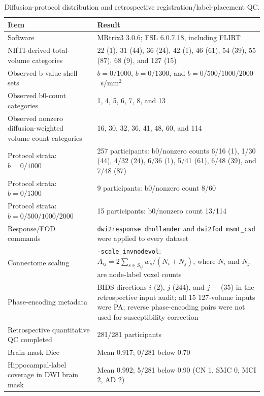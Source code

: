 \documentclass{article}
\providecommand{\DIFaddtex}[1]{{\protect\color{blue}#1}} %
\providecommand{\DIFaddFL}[1]{\DIFadd{#1}} %
\providecommand{\DIFadd}[1]{\texorpdfstring{\DIFaddtex{#1}}{#1}} %
\begin{document}
\begin{table}[!htbp]
\color{blue}
\centering
\caption{\DIFaddFL{Diffusion-protocol distribution and retrospective registration/label-placement QC.}}
\label{tab:protocol_qc_summary}
\footnotesize
\begin{tabularx}{\textwidth}{@{}p{}X@{}}
\toprule
\DIFaddFL{Item }& \DIFaddFL{Result}\\
\midrule
\DIFaddFL{Software }& \DIFaddFL{MRtrix3 3.0.6; FSL 6.0.7.18, including FLIRT}\\
\DIFaddFL{NIfTI-derived total-volume categories }& \DIFaddFL{22 (1), 31 (44), 36 (24), 42 (1), 46 (61), 54 (39), 55 (87), 68 (9), and 127 (15)}\\
\DIFaddFL{Observed b-value shell sets }& \DIFaddFL{$b=0/1000$, $b=0/1300$, and $b=0/500/1000/2000$~s/mm$^2$}\\
\DIFaddFL{Observed b0-count categories }& \DIFaddFL{1, 4, 5, 6, 7, 8, and 13}\\
\DIFaddFL{Observed nonzero diffusion-weighted volume-count categories }& \DIFaddFL{16, 30, 32, 36, 41, 48, 60, and 114}\\
\DIFaddFL{Protocol strata: $b=0/1000$ }& \DIFaddFL{257 participants: b0/nonzero counts 6/16 (1), 1/30 (44), 4/32 (24), 6/36 (1), 5/41 (61), 6/48 (39), and 7/48 (87)}\\
\DIFaddFL{Protocol strata: $b=0/1300$ }& \DIFaddFL{9 participants: b0/nonzero count 8/60}\\
\DIFaddFL{Protocol strata: $b=0/500/1000/2000$ }& \DIFaddFL{15 participants: b0/nonzero count 13/114}\\
\DIFaddFL{Response/FOD commands }& \DIFaddFL{\texttt{dwi2response dhollander} and \texttt{dwi2fod msmt\_csd} were applied to every dataset}\\
\DIFaddFL{Connectome scaling }& \DIFaddFL{\texttt{-scale\_invnodevol}: $A_{ij}=2\sum_{s\in S_{ij}}w_s/(N_i+N_j)$, where $N_i$ and $N_j$ are node-label voxel counts}\\
\DIFaddFL{Phase-encoding metadata }& \DIFaddFL{BIDS directions $i$ (2), $j$ (244), and $j-$ (35) in the retrospective input audit; all 15 127-volume inputs were PA; reverse phase-encoding pairs were not used for susceptibility correction}\\
\DIFaddFL{Retrospective quantitative QC completed }& \DIFaddFL{281/281 participants}\\
\DIFaddFL{Brain-mask Dice }& \DIFaddFL{Mean 0.917; 0/281 below 0.70}\\
\DIFaddFL{Hippocampal-label coverage in DWI brain mask }& \DIFaddFL{Mean 0.992; 5/281 below 0.90 (CN 1, SMC 0, MCI 2, AD 2)}\\

\end{tabularx}
\end{table}
\end{document}
